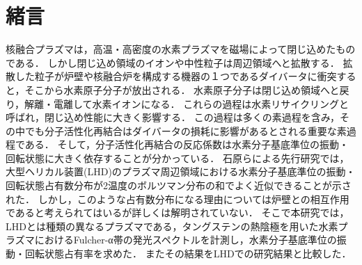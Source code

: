 \chapter{緒言}
\begin{comment}
新たな発電方法として，核融合発電が注目されている．
核融合発電とは重水素と三重水素の核融合反応によって生じるエネルギーを発電に利用する方法である．
核融合発電のメリットとして，海水から燃料を作り出せることや，二酸化炭素を排出しないこと，暴走のリスクが低く高レベルの核廃棄物を出さないことなどが挙げられる\cite{monbu-kagakusyou}．
しかし，実現までの技術的課題は多く，そのうちの一つにプラズマの閉じ込め性能の問題がある．
閉じ込め領域内の水素イオンは，中性粒子となってプラズマの周辺領域へと拡散してしまう．
\end{comment}
核融合プラズマは，高温・高密度の水素プラズマを磁場によって閉じ込めたものである．
しかし閉じ込め領域のイオンや中性粒子は周辺領域へと拡散する．
拡散した粒子が炉壁や核融合炉を構成する機器の１つであるダイバータに衝突すると，そこから水素原子分子が放出される．
水素原子分子は閉じ込め領域へと戻り，解離・電離して水素イオンになる．
これらの過程は水素リサイクリングと呼ばれ，閉じ込め性能に大きく影響する\cite{hiramatsu}．
この過程は多くの素過程を含み，その中でも分子活性化再結合はダイバータの損耗に影響があるとされる重要な素過程である．
そして，分子活性化再結合の反応係数は水素分子基底準位の振動・回転状態に大きく依存することが分かっている\cite{ishihara}．
石原らによる先行研究\cite{ishihara}では，大型ヘリカル装置(LHD)のプラズマ周辺領域における水素分子基底準位の振動・回転状態占有数分布が2温度のボルツマン分布の和でよく近似できることが示された．
しかし，このような占有数分布になる理由については炉壁との相互作用であると考えられてはいるが詳しくは解明されていない\cite{two-temperature-2}．
そこで本研究では，LHDとは種類の異なるプラズマである，タングステンの熱陰極を用いた水素プラズマにおけるFulcher-α帯の発光スペクトルを計測し，水素分子基底準位の振動・回転状態占有率を求めた．
またその結果をLHDでの研究結果\cite{ishihara}と比較した．

\begin{comment}
案2 2温度の理由
基底準位の振動・回転状態占有率は色々な反応に影響する．
例えば〇〇．他には〇〇．cite1.1807810.pdf
占有数は定回転量子数域では1温度，高回転量子数域まで含めると2温度のボルツマン分布で近似できることが報告されているcite
ところがその理由は壁表面との相互作用が原因とされているものの，詳しいことはわかっていないcite
さまざまな条件で計測することで
\end{comment}